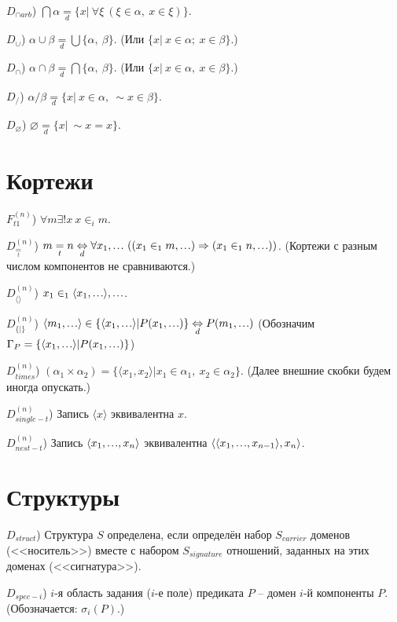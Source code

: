 \documentclass[a4paper]{article}
\newcommand\mydots{\hbox to 1em{.\hss.\hss.}}
\newcommand{\Def}[0]{\underset{d}{\Leftrightarrow}}
\newcommand{\defeq}[0]{\underset{d}{=}}
\newcommand{\eqt}[0]{\underset{t}{=}}
\begin{document}
$D_{\cap arb}$) $\bigcap \alpha \defeq \{x|~\forall \xi~(\xi \in \alpha,~x \in \xi)\}$.

$D_{\cup}$) $\alpha \cup \beta \defeq \bigcup\{\alpha,~\beta\}$. (Или $\{x|~x \in \alpha;~x \in \beta\}$.)

$D_{\cap}$) $\alpha \cap \beta \defeq \bigcap\{\alpha,~\beta\}$. (Или $\{x|~x \in \alpha,~x \in \beta\}$.)

$D_{/}$) $\alpha / \beta \defeq \{x|~x \in \alpha,~\sim x \in \beta\}$.

$D_{\varnothing}$) $\varnothing \defeq \{x|~\sim x = x\}$.

\section{Кортежи}

$F_{t1}^{(n)}$) $\forall m \exists!x~x \in_{i} m$.

$D_{\eqt}^{(n)}$) $m \eqt n \Def \forall x_1, \mydots~((x_1 \in_1 m, \mydots) \Rightarrow (x_1 \in_1 n, \mydots))$. (Кортежи с разным числом компонентов не сравниваются.)

$D_{\langle\rangle}^{(n)}$) $x_1 \in_1 \langle x_1, \mydots \rangle, \mydots$.

$D_{\{|\}}^{(n)}$) $\langle m_1, \mydots \rangle \in \{\langle x_1, \mydots \rangle|P(x_1, \mydots)\} \Def P(m_1, \mydots)$ (Обозначим $\Gamma_P = \{\langle x_1, \mydots \rangle|P(x_1, \mydots)\}$)

$D_{times}^{(n)}$) $(\alpha_1 \times \alpha_2) = \{\langle x_1, x_2 \rangle | x_1 \in \alpha_1,~x_2 \in \alpha_2\}$. (Далее внешние скобки будем иногда опускать.)

$D_{single-t}^{(n)}$) Запись $\langle x \rangle$ эквивалентна $x$.

$D_{nest-t}^{(n)}$) Запись $\langle x_1, \mydots, x_n \rangle$ эквивалентна $\langle \langle x_1, \mydots, x_{n-1} \rangle, x_n \rangle$.

\section{Структуры}

$D_{struct}$) Структура $S$ определена, если определён набор $S_{carrier}$ доменов (<<носитель>>) вместе с набором $S_{signature}$ отношений, заданных на этих доменах (<<сигнатура>>).

$D_{spec-i}$) $i$-я область задания ($i$-е поле) предиката $P$ -- домен $i$-й компоненты $P$. (Обозначается: $\sigma_i (P)$.)
\end{document}
